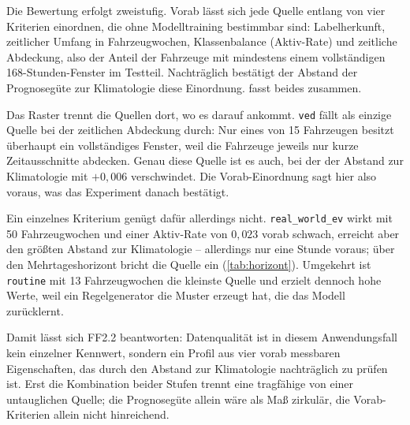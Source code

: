 Die Bewertung erfolgt zweistufig. Vorab lässt sich jede Quelle entlang von vier Kriterien einordnen, die ohne Modelltraining bestimmbar sind: Labelherkunft, zeitlicher Umfang in Fahrzeugwochen, Klassenbalance (Aktiv-Rate) und zeitliche Abdeckung, also der Anteil der Fahrzeuge mit mindestens einem vollständigen 168-Stunden-Fenster im Testteil. Nachträglich bestätigt der Abstand der Prognosegüte zur Klimatologie diese Einordnung.  fasst beides zusammen.

Das Raster trennt die Quellen dort, wo es darauf ankommt. \texttt{ved} fällt als einzige Quelle bei der zeitlichen Abdeckung durch: Nur eines von 15 Fahrzeugen besitzt überhaupt ein vollständiges Fenster, weil die Fahrzeuge jeweils nur kurze Zeitausschnitte abdecken. Genau diese Quelle ist es auch, bei der der Abstand zur Klimatologie mit $+0,006$ verschwindet. Die Vorab-Einordnung sagt hier also voraus, was das Experiment danach bestätigt.

Ein einzelnes Kriterium genügt dafür allerdings nicht. \texttt{real\_world\_ev} wirkt mit 50 Fahrzeugwochen und einer Aktiv-Rate von $0,023$ vorab schwach, erreicht aber den größten Abstand zur Klimatologie -- allerdings nur eine Stunde voraus; über den Mehrtageshorizont bricht die Quelle ein (\cref{tab:horizont}). Umgekehrt ist \texttt{routine} mit 13 Fahrzeugwochen die kleinste Quelle und erzielt dennoch hohe Werte, weil ein Regelgenerator die Muster erzeugt hat, die das Modell zurücklernt.

Damit lässt sich FF2.2 beantworten: Datenqualität ist in diesem Anwendungsfall kein einzelner Kennwert, sondern ein Profil aus vier vorab messbaren Eigenschaften, das durch den Abstand zur Klimatologie nachträglich zu prüfen ist. Erst die Kombination beider Stufen trennt eine tragfähige von einer untauglichen Quelle; die Prognosegüte allein wäre als Maß zirkulär, die Vorab-Kriterien allein nicht hinreichend.

